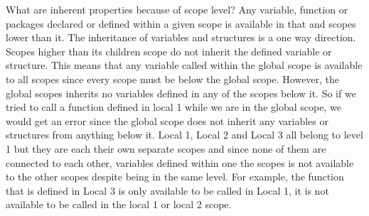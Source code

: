 \documentclass[11pt,a4paper]{book}
\begin{document}
				What are inherent properties because of scope level? Any variable, function or packages declared or defined within a given scope is available in that and scopes lower than it. The inheritance of variables and structures is a one way direction. Scopes higher than its children scope do not inherit the defined variable or structure. This means that any variable called within the global scope is available to all scopes since every scope must be below the global scope. However, the global scopes inherits no variables defined in any of the scopes below it. So if we tried to call a function defined in local 1 while we are in the global scope, we would get an error since the global scope does not inherit any variables or structures from anything below it. Local 1, Local 2 and Local 3 all belong to level 1 but they are each their own separate scopes and since none of them are connected to each other, variables defined within one the scopes is not available to the other scopes despite being in the same level. For example, the function that is defined in Local 3 is only available to be called in Local 1, it is not available to be called in the local 1 or local 2 scope. 
				
\end{document}
